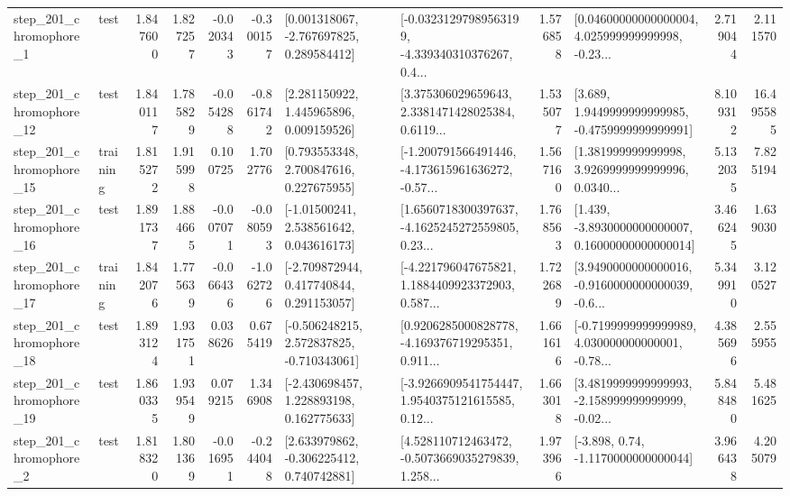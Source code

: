 \begin{tabular}{llrrrrllrlrr}
   step\_201\_chromophore\_1 &      test &      1.847600 &    1.827257 &     -0.020343 & -0.300157 &    [0.001318067, -2.767697825, 0.289584412] &  [-0.03231297989563199, -4.339340310376267, 0.4... &       1.576858 &  [0.04600000000000004, 4.025999999999998, -0.23... &            2.719044 &          2.111570 \\
  step\_201\_chromophore\_12 &      test &      1.840117 &    1.785829 &     -0.054288 & -0.861742 &     [2.281150922, 1.445965896, 0.009159526] &  [3.375306029659643, 2.3381471428025384, 0.6119... &       1.535077 &   [3.689, 1.9449999999999985, -0.4759999999999991] &            8.109312 &         16.495585 \\
  step\_201\_chromophore\_15 &  training &      1.815272 &    1.915998 &      0.100725 &  1.702776 &     [0.793553348, 2.700847616, 0.227675955] &  [-1.200791566491446, -4.173615961636272, -0.57... &       1.567160 &  [1.381999999999998, 3.9269999999999996, 0.0340... &            5.132035 &          7.825194 \\
  step\_201\_chromophore\_16 &      test &      1.891737 &    1.884665 &     -0.007071 & -0.080593 &     [-1.01500241, 2.538561642, 0.043616173] &  [1.6560718300397637, -4.1625245272559805, 0.23... &       1.768563 &  [1.439, -3.8930000000000007, 0.16000000000000014] &            3.466245 &          1.639030 \\
  step\_201\_chromophore\_17 &  training &      1.842076 &    1.775639 &     -0.066436 & -1.062726 &    [-2.709872944, 0.417740844, 0.291153057] &  [-4.221796047675821, 1.1884409923372903, 0.587... &       1.722689 &  [3.9490000000000016, -0.9160000000000039, -0.6... &            5.349910 &          3.120527 \\
  step\_201\_chromophore\_18 &      test &      1.893124 &    1.931751 &      0.038626 &  0.675419 &   [-0.506248215, 2.572837825, -0.710343061] &  [0.9206285000828778, -4.169376719295351, 0.911... &       1.661616 &  [-0.7199999999999989, 4.030000000000001, -0.78... &            4.385696 &          2.555955 \\
  step\_201\_chromophore\_19 &      test &      1.860335 &    1.939549 &      0.079215 &  1.346908 &    [-2.430698457, 1.228893198, 0.162775633] &  [-3.9266909541754447, 1.9540375121615585, 0.12... &       1.663018 &  [3.4819999999999993, -2.158999999999999, -0.02... &            5.848480 &          5.481625 \\
   step\_201\_chromophore\_2 &      test &      1.818320 &    1.801369 &     -0.016951 & -0.244048 &    [2.633979862, -0.306225412, 0.740742881] &  [4.528110712463472, -0.5073669035279839, 1.258... &       1.973966 &                [-3.898, 0.74, -1.1170000000000044] &            3.966438 &          4.205079 \\

\end{tabular}
